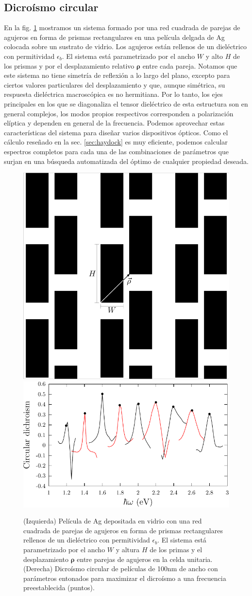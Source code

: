 \documentclass[12pt]{article}
\begin{document}
\subsection{Dicroísmo circular}
En la fig. \ref{fig:circular} mostramos un sistema formado por una red
cuadrada de parejas de agujeros en forma de prismas rectangulares en una película delgada
de Ag colocada sobre un sustrato de vidrio. Los agujeros están
rellenos de un dieléctrico con permitividad $\epsilon_b$. El sistema
está parametrizado por el ancho $W$ y alto $H$ de los prismas y por el
desplazamiento relativo $\bm \rho$ entre cada pareja. Notamos que
este sistema no tiene simetría de reflexión a lo largo del plano,
excepto para ciertos valores particulares del desplazamiento y que,
aunque simétrica, su respuesta dieléctrica macroscópica es no
hermitiana. Por lo tanto, los ejes principales en los que se
diagonaliza el tensor dieléctrico de esta estructura son en general
complejos, los modos propios respectivos corresponden a polarización elíptica y
dependen en general de la frecuencia. Podemos aprovechar estas
características del sistema para diseñar varios
dispositivos ópticos. Como el cálculo reseñado en la
sec. \ref{sec:haydock} es muy eficiente, podemos calcular espectros completos para
cada una de las combinaciones de parámetros que surjan en una búsqueda
automatizada del óptimo de cualquier propiedad deseada.
\cite{bms16}
\begin{figure}
  \centering
  \includegraphics[width=.3\textwidth]{polarizadorGeom}
  \includegraphics[width=.65\textwidth]{dicroismo}
  \caption{(Izquierda) Película de Ag  depositada en vidrio con una
    red cuadrada de parejas de agujeros en forma de prismas
    rectangulares rellenos de un dieléctrico con permitividad
    $\epsilon_b$. El sistema está
    parametrizado por el ancho $W$ y altura $H$ de los primas  y el
    desplazamiento ${\bm \rho}$ entre parejas de agujeros en la celda
    unitaria. (Derecha) Dicroísmo circular de películas de 100nm de
    ancho con parámetros entonados para maximizar el dicroísmo a una
    frecuencia preestablecida (puntos).}
  \label{fig:circular}
\end{figure}
\end{document}
